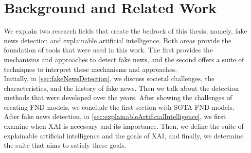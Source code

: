 
\chapter{Background and Related Work}\label{chapter:background}

We explain two research fields that create the bedrock of this thesis, namely, fake news detection and explainable artificial intelligence.
Both areas provide the foundation of tools that were used in this work. The first provides the mechanisms and approaches to detect fake news,
and the second offers a suite of techniques to interpret these mechanisms and approaches.\\
Initially, in \ref{sec:fakeNewsDetection}, we discuss societal challenges, the characteristics, and the history of fake news. Then we talk about the detection methods that were developed over the years. After showing the challenges of creating FND models, we conclude the first section with SOTA FND models.\\
After fake news detection, in \ref{sec:explainableArtificialIntelligence}, we first examine when XAI is necessary and its importance. Then, we define the suite of explainable artificial intelligence and the goals of XAI, and finally, we determine the suite that aims to satisfy these goals.\\
